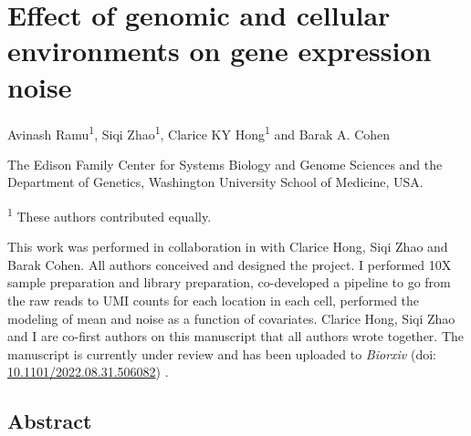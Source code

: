 \chapter{Effect of genomic and cellular environments on gene expression noise}
\label{chap:cas}

\vspace{0.2in}

Avinash Ramu\textsuperscript{1}, Siqi Zhao\textsuperscript{1}, Clarice KY Hong\textsuperscript{1} and Barak A. Cohen

\vspace{0.2in}

The Edison Family Center for Systems Biology and Genome Sciences and the Department of Genetics, Washington University School of Medicine, USA. 

\textsuperscript{1} These authors contributed equally.

\vspace{2in}

This work was performed in collaboration in with Clarice Hong, Siqi Zhao and Barak Cohen. All authors conceived and designed the project. I performed 10X sample preparation and library preparation, co-developed a pipeline to go from the raw reads to UMI counts for each location in each cell, performed the modeling of mean and noise as a function of covariates. Clarice Hong, Siqi Zhao and I are co-first authors on this manuscript that all authors wrote together. The manuscript is currently under review and has been uploaded to \textit{Biorxiv} (doi: \href{https://www.biorxiv.org/content/10.1101/2022.08.31.506082v1}{10.1101/2022.08.31.506082}) \cite{hongcky_cohenba:EffectGenomic2022}.

\newpage
\section{Abstract}

